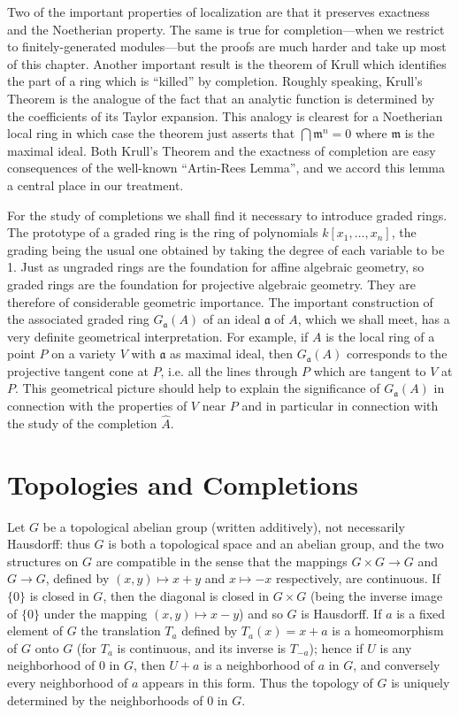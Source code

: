 Two of the important properties of localization are that it preserves exactness and the Noetherian property. The same is true for completion---when we restrict to finitely-generated modules---but the proofs are much harder and take up most of this chapter. Another important result is the theorem of Krull which identifies the part of a ring which is ``killed'' by completion. Roughly speaking, Krull's Theorem is the analogue of the fact that an analytic function is determined by the coefficients of its Taylor expansion. This analogy is clearest for a Noetherian local ring in which case the theorem just asserts that $\bigcap \mathfrak{m}^n = 0$ where $\mathfrak{m}$ is the maximal ideal. Both Krull's Theorem and the exactness of completion are easy consequences of the well-known ``Artin-Rees Lemma'', and we accord this lemma a central place in our treatment.

For the study of completions we shall find it necessary to introduce graded rings. The prototype of a graded ring is the ring of polynomials $k[x_1, \ldots, x_n]$, the grading being the usual one obtained by taking the degree of each variable to be 1. Just as ungraded rings are the foundation for affine algebraic geometry, so graded rings are the foundation for projective algebraic geometry. They are therefore of considerable geometric importance. The important construction of the associated graded ring $G_{\mathfrak{a}}(A)$ of an ideal $\mathfrak{a}$ of $A$, which we shall meet, has a very definite geometrical interpretation. For example, if $A$ is the local ring of a point $P$ on a variety $V$ with $\mathfrak{a}$ as maximal ideal, then $G_{\mathfrak{a}}(A)$ corresponds to the projective tangent cone at $P$, i.e. all the lines through $P$ which are tangent to $V$ at $P$. This geometrical picture should help to explain the significance of $G_{\mathfrak{a}}(A)$ in connection with the properties of $V$ near $P$ and in particular in connection with the study of the completion $\widehat{A}$.

\section*{Topologies and Completions}
Let $G$ be a topological abelian group (written additively), not necessarily Hausdorff: thus $G$ is both a topological space and an abelian group, and the two structures on $G$ are compatible in the sense that the mappings $G \times G \to G$ and $G \to G$, defined by $(x, y) \mapsto x + y$ and $x \mapsto -x$ respectively, are continuous. If $\{0\}$ is closed in $G$, then the diagonal is closed in $G \times G$ (being the inverse image of $\{0\}$ under the mapping $(x,y) \mapsto x - y$) and so $G$ is Hausdorff. If $a$ is a fixed element of $G$ the translation $T_a$ defined by $T_a(x) = x + a$ is a homeomorphism of $G$ onto $G$ (for $T_a$ is continuous, and its inverse is $T_{-a}$); hence if $U$ is any neighborhood of $0$ in $G$, then $U + a$ is a neighborhood of $a$ in $G$, and conversely every neighborhood of $a$ appears in this form. Thus the topology of $G$ is uniquely determined by the neighborhoods of $0$ in $G$.

